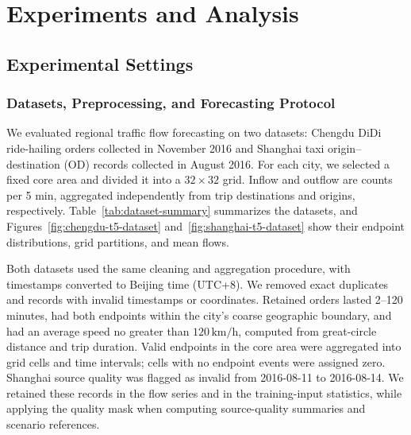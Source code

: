 \section{Experiments and Analysis}\label{sec:experiments}

\subsection{Experimental Settings}\label{sec:exp-settings}

\subsubsection{Datasets, Preprocessing, and Forecasting Protocol}\label{sec:exp-datasets}

We evaluated regional traffic flow forecasting on two datasets: Chengdu DiDi ride-hailing orders collected in November 2016 and Shanghai taxi origin--destination (OD) records collected in August 2016. For each city, we selected a fixed core area and divided it into a \(32\times32\) grid. Inflow and outflow are counts per 5 min, aggregated independently from trip destinations and origins, respectively. Table~\ref{tab:dataset-summary} summarizes the datasets, and Figures~\ref{fig:chengdu-t5-dataset} and~\ref{fig:shanghai-t5-dataset} show their endpoint distributions, grid partitions, and mean flows.

Both datasets used the same cleaning and aggregation procedure, with timestamps converted to Beijing time (UTC+8). We removed exact duplicates and records with invalid timestamps or coordinates. Retained orders lasted 2--120 minutes, had both endpoints within the city's coarse geographic boundary, and had an average speed no greater than \(120\,\mathrm{km/h}\), computed from great-circle distance and trip duration. Valid endpoints in the core area were aggregated into grid cells and time intervals; cells with no endpoint events were assigned zero. Shanghai source quality was flagged as invalid from 2016-08-11 to 2016-08-14. We retained these records in the flow series and in the training-input statistics, while applying the quality mask when computing source-quality summaries and scenario references.

